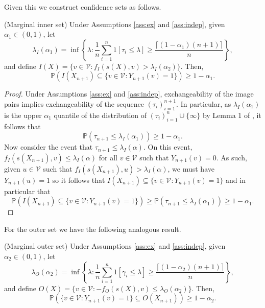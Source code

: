 Given this we construct confidence sets as follows.
\begin{theorem}\label{thm:inner}
	(Marginal inner set)
	Under Assumptions \ref{ass:ex} and \ref{ass:indep}, given $\alpha_1 \in (0,1)$, let 
	\begin{equation*}
		\lambda_I(\alpha_1) = \inf\left\lbrace \lambda: \frac{1}{n} \sum_{i = 1}^n 1\left[ \tau_i\leq \lambda \right] \geq \frac{\lceil (1-\alpha_1)(n+1) \rceil}{n}\right\rbrace,
	\end{equation*}
	and define $I(X) = \lbrace v \in \mathcal{V}: f_I(s(X), v) >\lambda_I(\alpha_2)  \rbrace $. Then,
	\begin{equation}\label{eq:probstat}
		\mathbb{P}\left( I(X_{n+1}) \subseteq\lbrace v\in \mathcal{V}: Y_{n+1}(v) = 1 \rbrace \right) \geq 1 - \alpha_1.
	\end{equation}
\end{theorem}
\begin{proof}
	Under Assumptions \ref{ass:ex} and \ref{ass:indep}, exchangeability of the image pairs implies exchangeability of the sequence $(\tau_i)_{i = 1}^{n+1}$. In particular, as $\lambda_I(\alpha_1)$ is the upper $\alpha_1$ quantile of the distribution of $(\tau_i)_{i = 1}^{n} \cup \lbrace \infty \rbrace $ by Lemma 1 of \cite{Tibshirani2019}, it follows that 
	\begin{equation*}
	\mathbb{P}\left(\tau_{n+1} \leq \lambda_I(\alpha_1) \right) \geq 1 - \alpha_1. 
	\end{equation*}
	Now consider the event that $\tau_{n+1}\leq \lambda_I(\alpha)$. On this event, $ f_I(s(X_{n+1}),v) \leq \lambda_I(\alpha) $
	for all $v \in \mathcal{V}$ such that $Y_{n+1}(v) = 0$. As such, given $u \in \mathcal{V}$ such that $ f_I(s(X_{n+1}), u) > \lambda_I(\alpha) $, we must have $Y_{n+1}(u) = 1$ so it follows that $I(X_{n+1}) \subseteq \lbrace v\in \mathcal{V}: Y_{n+1}(v) = 1 \rbrace  $ and in particular that 
	\begin{equation*}
	\mathbb{P}\left( I(X_{n+1}) \subseteq \lbrace v\in \mathcal{V}: Y_{n+1}(v) = 1 \rbrace  \right) \geq \mathbb{P}\left(\tau_{n+1} \leq \lambda_I(\alpha_1) \right) \geq 1 - \alpha_1. 
\end{equation*}
\end{proof}
\noindent For the outer set we have the following analogous result.
\begin{theorem}\label{thm:outer}
	(Marginal outer set)
	Under Assumptions \ref{ass:ex} and \ref{ass:indep}, given $\alpha_2 \in (0,1)$, let 
	\begin{equation*}
		\lambda_O({\alpha_2})= \inf\left\lbrace \lambda: \frac{1}{n} \sum_{i = 1}^n 1\left[ \gamma_i\leq \lambda \right] \geq \frac{\lceil (1-\alpha_2)(n+1) \rceil}{n} \right\rbrace,
	\end{equation*}
	and define $O(X) = \lbrace v \in \mathcal{V}: -f_O(s(X), v) \leq \lambda_O(\alpha_2)  \rbrace $. Then,
	\begin{equation}\label{eq:probstat}
		\mathbb{P}\left( \lbrace v\in \mathcal{V}: Y_{n+1}(v) = 1 \rbrace \subseteq O(X_{n+1}) \right) \geq 1 - \alpha_2.
	\end{equation}
\end{theorem}
